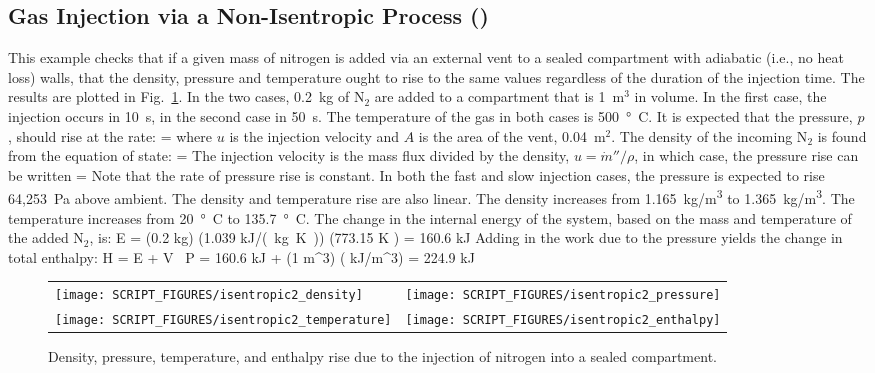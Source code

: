 \documentclass[11pt]{book}
\begin{document}
\subsection{Gas Injection via a Non-Isentropic Process (\texorpdfstring{}{isentropic2})}
\label{isentropic2}

This example checks that if a given mass of nitrogen is added via an external vent to a sealed compartment with adiabatic (i.e., no heat loss) walls, that the density, pressure and temperature ought to rise to the same values regardless of the duration of the injection time.  The results are plotted in Fig.~\ref{isentropic2_fig}. In the two cases, 0.2~kg of N$_2$ are added to a compartment that is 1~m$^3$ in volume. In the first case, the injection occurs in 10~s, in the second case in 50~s. The temperature of the gas in both cases is 500~\si{\degree C}. It is expected that the pressure, $p$, should rise at the rate:
\be
    = 
\ee
where $u$ is the injection velocity and $A$ is the area of the vent, 0.04~m$^2$. The density of the incoming N$_2$ is found from the equation of state:
\be
   \rho = 
\ee
The injection velocity is the mass flux divided by the density, $u=\dot{m}''/\rho$, in which case, the pressure rise can be written
\be
    = 
\ee
Note that the rate of pressure rise is constant. In both the fast and slow injection cases, the pressure is expected to rise 64,253~Pa above ambient. The density and temperature rise are also linear. The density increases from 1.165~\si{kg/m^3} to 1.365~\si{kg/m^3}. The temperature increases from 20~\si{\degree C} to 135.7~\si{\degree C}. The change in the internal energy of the system, based on the mass and temperature of the added N$_2$, is:
\be
   \Delta E = (0.2 \; \hbox{kg}) \times (1.039 \; \hbox{\si{kJ/(kg.K)}}) \times (773.15 \; \hbox{K} ) = 160.6 \; \hbox{kJ}
\ee
Adding in the work due to the pressure yields the change in total enthalpy:
\be
   \Delta H = \Delta E + V \, \Delta P = 160.6 \; \hbox{kJ} + (1 \; \hbox{m}^3) \times (  \; \hbox{kJ/m}^3) = 224.9 \; \hbox{kJ}
\ee

\begin{figure}[ht]
\begin{tabular*}{\textwidth}{lr}
\texttt{[image: SCRIPT\_FIGURES/isentropic2\_density]} &
\texttt{[image: SCRIPT\_FIGURES/isentropic2\_pressure]} \\
\texttt{[image: SCRIPT\_FIGURES/isentropic2\_temperature]} &
\texttt{[image: SCRIPT\_FIGURES/isentropic2\_enthalpy]}
\end{tabular*}
\caption[The  test case]{Density, pressure, temperature, and enthalpy rise due to the injection of nitrogen into a sealed compartment.}
\label{isentropic2_fig}
\end{figure}
\end{document}
